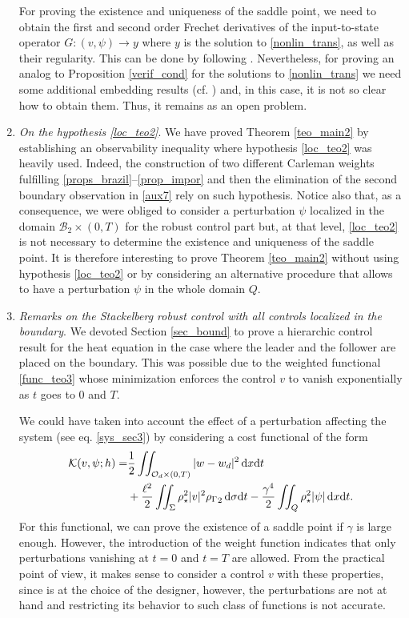 \documentclass{aims}
\theoremstyle{definition}
\def\csbd{\rho_{\Gamma}}
\def\dx{\,\textnormal{d}x}
\def\dt{\textnormal{d}t}
\def\d{\,\textnormal{d}}
\begin{document}
\begin{enumerate}
For proving the existence and uniqueness of the saddle point, we need to obtain the first and second order Frechet derivatives of the input-to-state operator $G:(v,\psi)\to y$ where $y$ is the solution to \eqref{nonlin_trans}, {as well as their regularity.} This can be done by following \cite{vhs_deT_rob}. Nevertheless, for proving an analog to Proposition \ref{verif_cond} for the solutions to \eqref{nonlin_trans} we need some additional embedding results (cf. \cite[Proof of Prop. 2]{vhs_deT_rob}) and, in this case, it is not so clear how to obtain them. Thus, it remains as an open problem.
%
\item \textit{On the hypothesis \eqref{loc_teo2}}. We have proved Theorem \ref{teo_main2} by establishing an observability inequality where hypothesis \eqref{loc_teo2} was heavily used. Indeed, the construction of two different Carleman weights fulfilling \eqref{props_brazil}--\eqref{prop_impor} and then the elimination of the second boundary observation in \eqref{aux7} rely on such hypothesis. Notice also that, as a consequence, we were obliged to consider a perturbation $\psi$ localized in the domain $\mathcal B_2\times(0,T)$ for the robust control part but, at that level, \eqref{loc_teo2} is not necessary to determine the existence and uniqueness of the saddle point. It is therefore interesting to prove Theorem \ref{teo_main2} without using hypothesis \eqref{loc_teo2} or by considering an alternative procedure that allows to have a perturbation $\psi$ in the whole domain $Q$. 

\item \textit{Remarks on the Stackelberg robust control with all controls localized in the boundary}. We devoted Section \ref{sec_bound} to prove a hierarchic control result for the heat equation in the case where the leader and the follower are placed on the boundary. This was possible due to the weighted functional \eqref{func_teo3} whose minimization enforces the control $v$ to vanish exponentially as $t$ goes to $0$ and $T$. 

We could have taken into account the effect of a perturbation affecting the system (see eq. \eqref{sys_sec3}) by considering a cost functional of the form
%
\begin{equation*}
\begin{split}
\mathcal K(v,\psi;h)=&\frac{1}{2}\iint_{\mathcal O_d\times(0,T)}|w-w_d|^2\dx\dt\\
&+\frac{\ell^2}{2}\iint_{\Sigma}\rho_\star^2|v|^2{\csbd}_2\d\sigma\dt-\frac{\gamma^4}{2}\iint_{Q}\rho_\star^2|\psi|\dx\dt.
\end{split}
\end{equation*}
%
For this functional, we can prove the existence of a saddle point if $\gamma$ is large enough. However, the introduction of the weight function indicates that only perturbations vanishing at $t=0$ and $t=T$ are allowed. From the practical point of view, it makes sense to consider a control $v$ with these properties, since is at the choice of the designer, however, the perturbations are not at hand and restricting its behavior to such class of functions is not accurate.


\end{enumerate}
\end{document}
